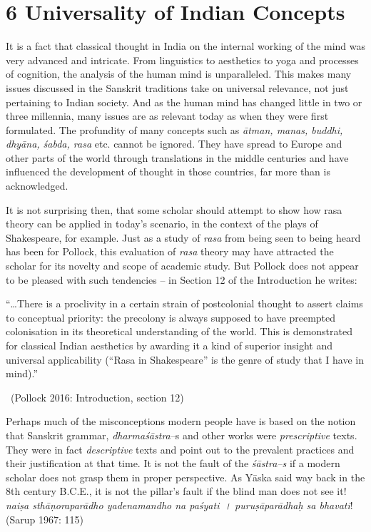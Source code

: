 \section*{6 Universality of Indian Concepts}

It is a fact that classical thought in India on the internal working of the mind was very advanced and intricate. From linguistics to aesthetics to yoga and processes of cognition, the analysis of the human mind is unparalleled. This makes many issues discussed in the Sanskrit traditions take on universal relevance, not just pertaining to Indian society. And as the human mind has changed little in two or three millennia, many issues are as relevant today as when they were first formulated. The profundity of many concepts such as \textit{ātman, manas, buddhi, dhyāna, śabda, rasa} etc. cannot be ignored. They have spread to Europe and other parts of the world through translations in the middle centuries and have influenced the development of thought in those countries, far more than is acknowledged.

It is not surprising then, that some scholar should attempt to show how rasa theory can be applied in today’s scenario, in the context of the plays of Shakespeare, for example. Just as a study of \textit{rasa} from being seen to being heard has been for Pollock, this evaluation of \textit{rasa} theory may have attracted the scholar for its novelty and scope of academic study. But Pollock does not appear to be pleased with such tendencies – in Section 12 of the Introduction he writes:

\begin{myquote}
“…There is a proclivity in a certain strain of postcolonial thought to assert claims to conceptual priority: the precolony is always supposed to have preempted colonisation in its theoretical understanding of the world. This is demonstrated for classical Indian aesthetics by awarding it a kind of superior insight and universal applicability (“Rasa in Shakespeare” is the genre of study that I have in mind).” 

~\hfill (Pollock 2016: Introduction, section 12)
\end{myquote}

Perhaps much of the misconceptions modern people have is based on the notion that Sanskrit grammar, \textit{dharmaśāstra}–s and other works were \textit{prescriptive} texts. They were in fact \textit{descriptive} texts and point out to the prevalent practices and their justification at that time. It is not the fault of the \textit{śāstra–s} if a modern scholar does not grasp them in proper perspective. As Yāska said way back in the 8th century B.C.E., it is not the pillar’s fault if the blind man does not see it! \textit{naiṣa sthāṇoraparādho yadenamandho na paśyati~। puruṣāparādhaḥ sa bhavati}! (Sarup 1967: 115)


